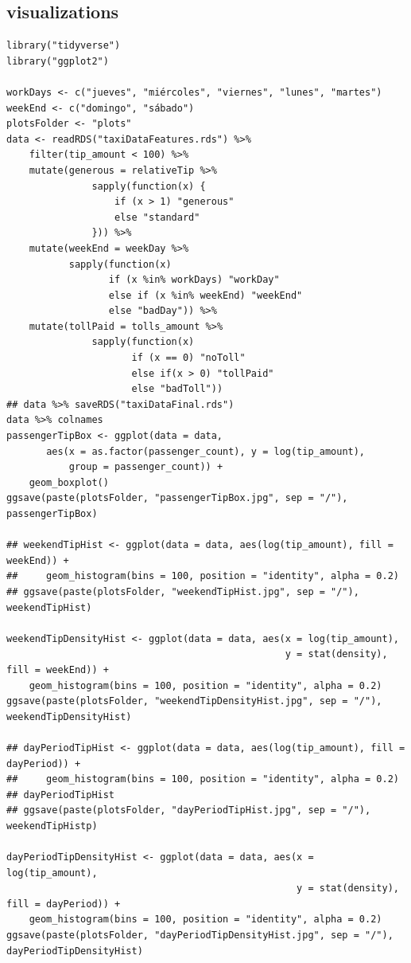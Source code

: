 \documentclass[11pt]{article}
\begin{document}
\subsection{visualizations}
\label{sec:org9944dbd}
\begin{verbatim}
library("tidyverse")
library("ggplot2")

workDays <- c("jueves", "miércoles", "viernes", "lunes", "martes")
weekEnd <- c("domingo", "sábado")
plotsFolder <- "plots"
data <- readRDS("taxiDataFeatures.rds") %>%
    filter(tip_amount < 100) %>% 
    mutate(generous = relativeTip %>%
               sapply(function(x) {
                   if (x > 1) "generous"
                   else "standard"
               })) %>%
    mutate(weekEnd = weekDay %>%
           sapply(function(x)
                  if (x %in% workDays) "workDay"
                  else if (x %in% weekEnd) "weekEnd"
                  else "badDay")) %>%
    mutate(tollPaid = tolls_amount %>%
               sapply(function(x)
                      if (x == 0) "noToll"
                      else if(x > 0) "tollPaid"
                      else "badToll"))
## data %>% saveRDS("taxiDataFinal.rds")
data %>% colnames
passengerTipBox <- ggplot(data = data,
       aes(x = as.factor(passenger_count), y = log(tip_amount),
           group = passenger_count)) +
    geom_boxplot()
ggsave(paste(plotsFolder, "passengerTipBox.jpg", sep = "/"),  passengerTipBox)

## weekendTipHist <- ggplot(data = data, aes(log(tip_amount), fill = weekEnd)) +
##     geom_histogram(bins = 100, position = "identity", alpha = 0.2)
## ggsave(paste(plotsFolder, "weekendTipHist.jpg", sep = "/"),  weekendTipHist)

weekendTipDensityHist <- ggplot(data = data, aes(x = log(tip_amount),
                                                 y = stat(density), fill = weekEnd)) +
    geom_histogram(bins = 100, position = "identity", alpha = 0.2)
ggsave(paste(plotsFolder, "weekendTipDensityHist.jpg", sep = "/"),  weekendTipDensityHist)

## dayPeriodTipHist <- ggplot(data = data, aes(log(tip_amount), fill = dayPeriod)) +
##     geom_histogram(bins = 100, position = "identity", alpha = 0.2)
## dayPeriodTipHist
## ggsave(paste(plotsFolder, "dayPeriodTipHist.jpg", sep = "/"),  weekendTipHistp)

dayPeriodTipDensityHist <- ggplot(data = data, aes(x = log(tip_amount),
                                                   y = stat(density), fill = dayPeriod)) +
    geom_histogram(bins = 100, position = "identity", alpha = 0.2)
ggsave(paste(plotsFolder, "dayPeriodTipDensityHist.jpg", sep = "/"),  dayPeriodTipDensityHist)


\end{verbatim}
\end{document}
